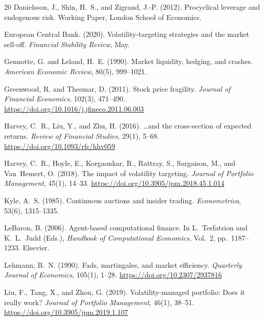 \documentclass[12pt,a4paper]{article}
\begin{document}
\begin{thebibliography}{20}
Danielsson, J., Shin, H.~S., and Zigrand, J.-P. (2012).
\newblock Procyclical leverage and endogenous risk.
\newblock Working Paper, London School of Economics.

{European Central Bank}. (2020).
\newblock Volatility-targeting strategies and the market sell-off.
\newblock \emph{Financial Stability Review}, May.

Gennotte, G. and Leland, H.~E. (1990).
\newblock Market liquidity, hedging, and crashes.
\newblock \emph{American Economic Review}, 80(5), 999--1021.

Greenwood, R. and Thesmar, D. (2011).
\newblock Stock price fragility.
\newblock \emph{Journal of Financial Economics}, 102(3), 471--490.
\newblock \url{https://doi.org/10.1016/j.jfineco.2011.06.003}

Harvey, C.~R., Liu, Y., and Zhu, H. (2016).
\newblock \ldots and the cross-section of expected returns.
\newblock \emph{Review of Financial Studies}, 29(1), 5--68.
\newblock \url{https://doi.org/10.1093/rfs/hhv059}

Harvey, C.~R., Hoyle, E., Korgaonkar, R., Rattray, S., Sargaison, M., and Van~Hemert, O. (2018).
\newblock The impact of volatility targeting.
\newblock \emph{Journal of Portfolio Management}, 45(1), 14--33.
\newblock \url{https://doi.org/10.3905/jpm.2018.45.1.014}

Kyle, A.~S. (1985).
\newblock Continuous auctions and insider trading.
\newblock \emph{Econometrica}, 53(6), 1315--1335.

LeBaron, B. (2006).
\newblock Agent-based computational finance.
\newblock In L.~Tesfatsion and K.~L.~Judd (Eds.), \emph{Handbook of Computational Economics}, Vol.~2, pp.~1187--1233. Elsevier.

Lehmann, B.~N. (1990).
\newblock Fads, martingales, and market efficiency.
\newblock \emph{Quarterly Journal of Economics}, 105(1), 1--28.
\newblock \url{https://doi.org/10.2307/2937816}

Liu, F., Tang, X., and Zhou, G. (2019).
\newblock Volatility-managed portfolio: Does it really work?
\newblock \emph{Journal of Portfolio Management}, 46(1), 38--51.
\newblock \url{https://doi.org/10.3905/jpm.2019.1.107}


\end{thebibliography}
\end{document}
